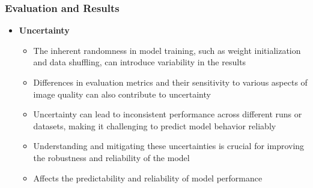 \documentclass[aspectratio=169, lecture, amberg]{OTHAWbeamer}
\begin{document}
\begin{frame}
    \frametitle{Evaluation and Results}
    \begin{itemize}
        \item \textbf{Uncertainty}
        \vspace{0.2cm}
        \begin{itemize}
            \item <1-> The inherent randomness in model training, such as weight initialization and data shuffling, can introduce variability in the results
            \vspace{0.2cm}
            \item <2-> Differences in evaluation metrics and their sensitivity to various aspects of image quality can also contribute to uncertainty
            \vspace{0.2cm}
            \item <3-> Uncertainty can lead to inconsistent performance across different runs or datasets, making it challenging to predict model behavior reliably
            \vspace{0.2cm}
            \item <4-> Understanding and mitigating these uncertainties is crucial for improving the robustness and reliability of the model
            \vspace{0.2cm}
            \item <5-> Affects the predictability and reliability of model performance
        \end{itemize}
    \end{itemize}
    
\end{frame}
\end{document}

